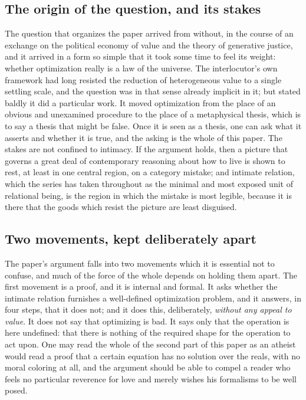 \subsection*{The origin of the question, and its stakes}

The question that organizes the paper arrived from without, in the course of an exchange on the political economy of value and the theory of generative justice, and it arrived in a form so simple that it took some time to feel its weight: whether optimization really is a law of the universe. The interlocutor's own framework had long resisted the reduction of heterogeneous value to a single settling scale, and the question was in that sense already implicit in it; but stated baldly it did a particular work. It moved optimization from the place of an obvious and unexamined procedure to the place of a metaphysical thesis, which is to say a thesis that might be false. Once it is seen as a thesis, one can ask what it asserts and whether it is true, and the asking is the whole of this paper. The stakes are not confined to intimacy. If the argument holds, then a picture that governs a great deal of contemporary reasoning about how to live is shown to rest, at least in one central region, on a category mistake; and intimate relation, which the series has taken throughout as the minimal and most exposed unit of relational being, is the region in which the mistake is most legible, because it is there that the goods which resist the picture are least disguised.

\subsection*{Two movements, kept deliberately apart}

The paper's argument falls into two movements which it is essential not to confuse, and much of the force of the whole depends on holding them apart. The first movement is a proof, and it is internal and formal. It asks whether the intimate relation furnishes a well-defined optimization problem, and it answers, in four steps, that it does not; and it does this, deliberately, \emph{without any appeal to value}. It does not say that optimizing is bad. It says only that the operation is here undefined: that there is nothing of the required shape for the operation to act upon. One may read the whole of the second part of this paper as an atheist would read a proof that a certain equation has no solution over the reals, with no moral coloring at all, and the argument should be able to compel a reader who feels no particular reverence for love and merely wishes his formalisms to be well posed.

